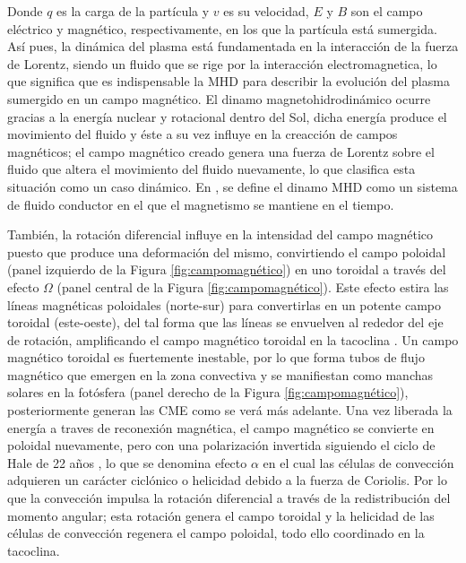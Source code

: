 Donde $q$ es la carga de la partícula y $v$ es su velocidad, $E$ y $B$ son el campo eléctrico y magnético, respectivamente, en los que la partícula está sumergida. Así pues, la dinámica del plasma está fundamentada en la interacción de la fuerza de Lorentz, siendo un fluido que se rige por la interacción electromagnetica, lo que significa que es indispensable la \ac{MHD} para describir la evolución del plasma sumergido en un campo magnético. El dinamo magnetohidrodinámico ocurre gracias a la energía nuclear y rotacional dentro del Sol, dicha energía produce el movimiento del fluido y éste a su vez influye en la creacción de campos magnéticos; el campo magnético creado genera una fuerza de Lorentz sobre el fluido que altera el movimiento del fluido nuevamente, lo que clasifica esta situación como un caso dinámico. En \textcite[e.g.,]{lugaz-2005}, se define el dinamo MHD como un sistema de fluido conductor en el que el magnetismo se mantiene en el tiempo.

También, la rotación diferencial influye en la intensidad del campo magnético puesto que produce una deformación del mismo, convirtiendo el campo poloidal (panel izquierdo de la Figura \ref{fig:campomagnético}) en uno toroidal a través del efecto $\Omega$ (panel central de la Figura \ref{fig:campomagnético}). Este efecto estira las líneas magnéticas poloidales (norte-sur) para convertirlas en un potente campo toroidal (este-oeste), del tal forma que las líneas se envuelven al rededor del eje de rotación, amplificando el campo magnético toroidal en la tacoclina \parencite[e.g.,][]{hughes-2007}. Un campo magnético toroidal es fuertemente inestable, por lo que forma tubos de flujo magnético que emergen en la zona convectiva y se manifiestan como manchas solares en la fotósfera (panel derecho de la Figura \ref{fig:campomagnético}), posteriormente generan las \ac{CME} como se verá más adelante. Una vez liberada la energía a traves de reconexión magnética, el campo magnético se convierte en poloidal nuevamente, pero con una polarización invertida siguiendo el ciclo de Hale de 22 años \parencite[e.g.,]{lugaz-2005, ossendrijver-2003}, lo que se denomina efecto $\alpha$ en el cual las células de convección adquieren un carácter ciclónico o helicidad debido a la fuerza de Coriolis. Por lo que la convección impulsa la rotación diferencial a través de la redistribución del momento angular; esta rotación genera el campo toroidal y la helicidad de las células de convección regenera el campo poloidal, todo ello coordinado en la tacoclina.

